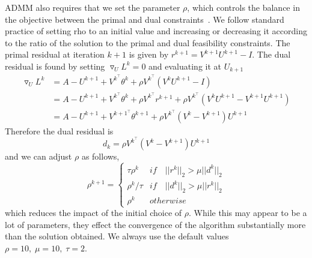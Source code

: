 \documentclass{article}
\begin{document}
ADMM also requires that we set the parameter $\rho$, which controls the
balance in the objective between the primal and dual constraints~\cite{Boyd2010}. We
follow standard practice of setting rho to an initial value and increasing
or decreasing it according to the ratio of the solution to the primal
and dual feasibility constraints. The primal residual at iteration $k+1$ is
given by $r^{k+1} = V^{k+1} U^{k+1} - I$. The dual residual is found by
setting $\triangledown_{U} L^k = 0$ and evaluating it at $U_{k+1}$
\begin{align*}
\triangledown_U L^{k} &= A - U^{k+1} + V^{k^\top} \theta^k + \rho V^{k^\top}(V^k U^{k+1}-I) \\
  &= A - U^{k+1} + V^{k^\top} \theta^k + \rho V^{k^\top}r^{k+1} + \rho V^{k^\top}(V^k U^{k+1}-V^{k+1} U^{k+1}) \\
  &= A - U^{k+1} + V^{k+1^\top} \theta^{k+1} + \rho V^{k^\top}(V^k - V^{k+1})U^{k+1}
\end{align*}
Therefore the dual residual is~\cite{Boyd2010}
\begin{equation*}
d_k = \rho V^{k^\top}(V^k - V^{k+1})U^{k+1}
\end{equation*}
and we can adjust $\rho$ as follows,
\begin{equation*}
\rho^{k+1} = \left\{ \begin{array}{ll}
  \tau \rho^k & if\quad ||r^k||_2 > \mu ||d^k||_2 \\
  \rho^k/\tau & if\quad ||d^k||_2 > \mu ||r^k||_2 \\
  \rho^k & otherwise \end{array} \right.
\end{equation*}
which reduces the impact of the initial choice of $\rho$. While this
may appear to be a lot of parameters, they effect the convergence of
the algorithm substantially more than the solution obtained.
We always use the default values $\rho = 10,\;\mu = 10,\;\tau = 2$.
\end{document}
